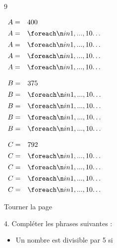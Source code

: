 \documentclass[a4paper]{book}
\begin{document}
{\begin{exerciceNote}{9}
\begin{enumerate}[leftmargin=*]
            \begin{minipage}{0.30\linewidth}
                $\begin{array}{ll}
                    A = & 400 \\[1ex]
                    A = & \points[10]\\[1ex]
                    A = & \points[10]\\[1ex]
                    A = & \points[10]\\[1ex]
                    A = & \points[10]
                \end{array}$
    
            \end{minipage}
            \hfill
            \begin{minipage}{0.30\linewidth}
                $\begin{array}{ll}
                    B = & 375 \\[1ex]
                    B = & \points[10] \\[1ex]
                    B = & \points[10] \\[1ex]
                    B = & \points[10] \\[1ex]
                    B = & \points[10] 
                \end{array}$    
            \end{minipage}
            \hfill
            \begin{minipage}[t]{0.30\linewidth}
                $\begin{array}{ll}
                    C = & 792 \\[1ex]
                    C = & \points[10] \\[1ex]
                    C = & \points[10] \\[1ex]
                    C = & \points[10] \\[1ex]
                    C = & \points[10] 
                \end{array}$
            \end{minipage}
        \end{enumerate}
    \end{exerciceNote}

    \vfill\hfill Tourner la page

    \begin{exercice}
                4. Compléter les phrases suivantes :
        \begin{itemize}
            \item Un nombre est divisible par 5 si \dotfill


\end{itemize}
\end{exercice}}
\end{document}
